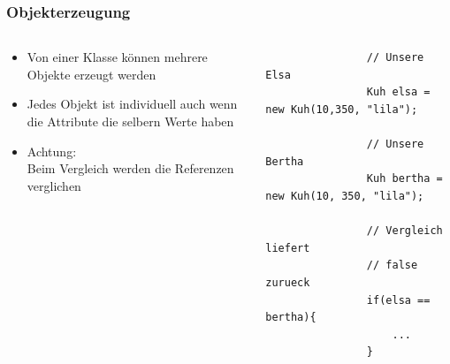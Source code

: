 \begin{frame}[fragile]
	\frametitle{Objekterzeugung}
	\begin{columns}
		\begin{column}{0.5\textwidth}
			\small
			\begin{itemize}
			  \item Von einer Klasse k\"onnen mehrere Objekte erzeugt werden
			  \item Jedes Objekt ist individuell auch wenn die Attribute
			  die selbern Werte haben
			  \item Achtung: \\
			  Beim Vergleich werden die Referenzen verglichen
			\end{itemize}
		\end{column}
		\begin{column}{0.5\textwidth}
			\begin{lstlisting}
				// Unsere Elsa
				Kuh elsa = new Kuh(10,350, "lila");
				
				// Unsere Bertha
				Kuh bertha = new Kuh(10, 350, "lila");
				
				// Vergleich liefert
				// false zurueck
				if(elsa == bertha){
					...
				} 
			\end{lstlisting}
		\end{column}
	\end{columns}
\end{frame}

